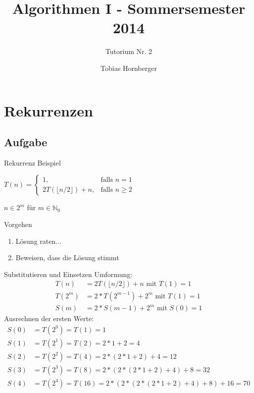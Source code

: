 \documentclass[18pt]{beamer}
\title[Algo Tutorium Nr.2]{Algorithmen I - Sommersemester 2014}
\subtitle{Tutorium Nr. 2}
\author{Tobias Hornberger}
\institute{Institut für Theoretische Informatik}
\begin{document}

\begin{frame}
\titlepage
\end{frame}


\section{Rekurrenzen}
\subsection{Aufgabe}
\begin{frame}{Rekurrenz Beispiel}
	\begin{center}
		$ T(n)=\left\{\begin{array}{cr} 1, & \mbox{falls } n = 1\\ 2 T(\lfloor n / 2 \rfloor) + n, & \mbox{falls } n \geq 2 \end{array}\right. $

		\parskip 14pt
		$n \in 2 ^{m} $ für $ m \in \mathbb{N} _{0} $

	\end{center}
	\begin{block}{Vorgehen}
		\begin{enumerate}
			\item Lösung raten...
			\item Beweisen, dass die Lösung stimmt
		\end{enumerate}
	\end{block}
\end{frame}

\begin{frame}{Substitutieren und Einsetzen}
	Umformung:
	\begin{align*}
		T(n) &= 2 T(\lfloor n / 2 \rfloor) + n \text{ mit } T(1) = 1\\
		T(2^m) &= 2* T(2^{m - 1}) + 2^m \text{ mit } T(1) = 1\\
		S(m) &= 2 * S(m-1) + 2^m \text{ mit } S(0) = 1
	\end{align*}
	Ausrechnen der ersten Werte:
	\begin{align*}
		S(0) &= T(2^0) = T(1)  = 1\\
		S(1) &= T(2^1) = T(2)  = 2 * 1 + 2 = 4\\
		S(2) &= T(2^2) = T(4)  = 2 * (2 * 1 + 2) + 4 = 12\\
		S(3) &= T(2^3) = T(8)  = 2 * (2 * (2 * 1 + 2) + 4 ) + 8 = 32\\
		S(4) &= T(2^4) = T(16) = 2 * ( 2 * (2 * (2 * 1 + 2) + 4 ) + 8 ) + 16 = 70
	\end{align*}
\end{frame}
\end{document}

